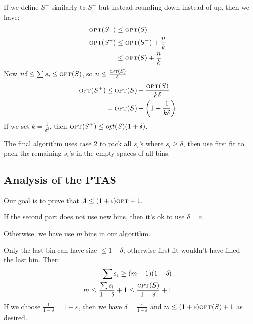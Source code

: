 \begin{enumerate}
                        If we define $S^-$ similarly to $S^+$ but instead rounding down instead of up, then we have:
                        \begin{align*}
                            \textsc{opt}(S^-) &\le \textsc{opt}(S) \\
                            \textsc{opt}(S^+) &\le \textsc{opt}(S^-) + \frac{n}{k} \\
                            &\le \textsc{opt}(S) + \frac{n}{k}
                        \end{align*}
                        Now $n \delta \le \sum s_i \le \textsc{opt}(S)$, so $n \le \frac{\textsc{opt}(S)}{\delta}$.
                        \begin{align*}
                            \textsc{opt}(S^+) &\le \textsc{opt}(S) + \frac{\textsc{opt}(S)}{k\delta} \\
                            &= \textsc{opt}(S) + \left( 1 + \frac{1}{k \delta} \right)
                        \end{align*}
                        If we set $k = \frac{1}{\delta^2}$, then $\textsc{opt}(S^+) \le opt(S)(1 + \delta)$.
                \end{enumerate}
                The final algorithm uses case 2 to pack all $s_i$'s where $s_i \ge \delta$, then use first fit to pack the remaining $s_i$'s in the empty spaces of all bins.

                \subsection{Analysis of the PTAS} %
                \label{sub:analysis_of_the_ptas}
                    Our goal is to prove that $A \le (1 + \varepsilon) \textsc{opt} + 1$.

                    If the second part does not use new bins, then it's ok to use $\delta = \varepsilon$.

                    Otherwise, we have use $m$ bins in our algorithm.

                    Only the last bin can have size $\le 1 - \delta$, otherwise first fit wouldn't have filled the last bin.
                    Then:
                    \begin{align*}
                        \sum s_i \ge (m-1)(1-\delta) \\
                        m \le \frac{\sum s_i}{1-\delta} + 1 \le \frac{\textsc{opt}(S)}{1 - \delta} + 1
                    \end{align*}
                    If we choose $\frac{1}{1-\delta} = 1 + \varepsilon$, then we have $\delta = \frac{\varepsilon}{1 + \varepsilon}$ and $m \le (1 + \varepsilon) \textsc{opt}(S) + 1$ as desired.

